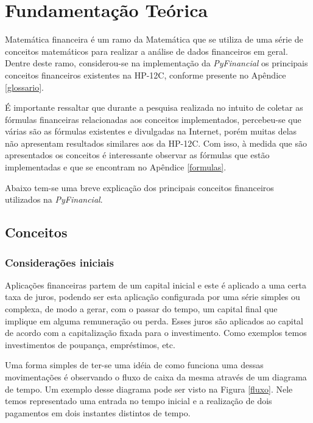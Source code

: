 \chapter{Fundamentação Teórica}

Matemática financeira é um ramo da Matemática que se utiliza de uma série de conceitos matemáticos para realizar a análise de dados financeiros em geral. Dentre deste ramo,  considerou-se na implementação da \textit{PyFinancial} os principais conceitos financeiros existentes na HP-12C, conforme presente no Apêndice \ref{glossario}.

É importante ressaltar que durante a pesquisa realizada no intuito de coletar as fórmulas financeiras relacionadas aos conceitos implementados, percebeu-se que várias são as fórmulas existentes e divulgadas na Internet, porém muitas delas não apresentam resultados similares aos da HP-12C. Com isso, à medida que são apresentados os conceitos é interessante observar as fórmulas que estão implementadas e que se encontram no Apêndice \ref{formulas}.

Abaixo tem-se uma breve explicação dos principais conceitos financeiros utilizados na \textit{PyFinancial}.

\section{Conceitos}

\subsection{Considerações iniciais}

Aplicações financeiras partem de um capital inicial e este é aplicado a uma certa taxa de juros, podendo ser esta aplicação configurada por uma série simples ou complexa, de modo a gerar, com o passar do tempo, um capital final que implique em alguma remuneração ou perda. Esses juros são aplicados ao capital de acordo com a capitalização fixada para o investimento. Como exemplos temos investimentos de poupança, empréstimos, etc.

Uma forma simples de ter-se uma idéia de como funciona uma dessas movimentações é observando o fluxo de caixa da mesma através de um diagrama de tempo. Um exemplo desse diagrama pode ser visto na Figura \ref{fluxo}. Nele temos representado uma entrada no tempo inicial e a realização de dois pagamentos em dois instantes distintos de tempo.


